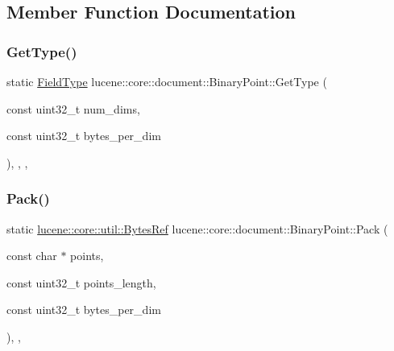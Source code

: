 \subsection{Member Function Documentation}
\mbox{\label{classlucene_1_1core_1_1document_1_1BinaryPoint_a257a399b76249bf887b61a524765fa72}} 
\subsubsection{\texorpdfstring{Get\+Type()}{GetType()}}
{\footnotesize\ttfamily static \mbox{\hyperlink{classlucene_1_1core_1_1document_1_1FieldType}{Field\+Type}} lucene\+::core\+::document\+::\+Binary\+Point\+::\+Get\+Type (\begin{DoxyParamCaption}\item[{const uint32\+\_\+t}]{num\+\_\+dims,  }\item[{const uint32\+\_\+t}]{bytes\+\_\+per\+\_\+dim }\end{DoxyParamCaption})\hspace{0.3cm}{\ttfamily [inline]}, {\ttfamily [static]}, {\ttfamily [private]}, {\ttfamily [noexcept]}}

\mbox{\label{classlucene_1_1core_1_1document_1_1BinaryPoint_a3dd125364391f40b4cc114c3a099542e}} 
\subsubsection{\texorpdfstring{Pack()}{Pack()}}
{\footnotesize\ttfamily static \mbox{\hyperlink{classlucene_1_1core_1_1util_1_1BytesRef}{lucene\+::core\+::util\+::\+Bytes\+Ref}} lucene\+::core\+::document\+::\+Binary\+Point\+::\+Pack (\begin{DoxyParamCaption}\item[{const char $\ast$}]{points,  }\item[{const uint32\+\_\+t}]{points\+\_\+length,  }\item[{const uint32\+\_\+t}]{bytes\+\_\+per\+\_\+dim }\end{DoxyParamCaption})\hspace{0.3cm}{\ttfamily [inline]}, {\ttfamily [static]}, {\ttfamily [private]}}

